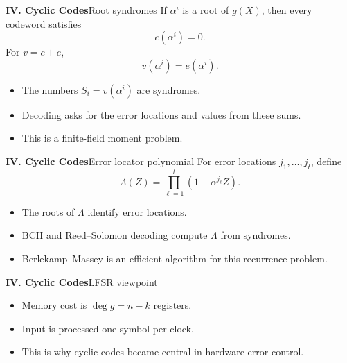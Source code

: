 \begin{frame}{\textbf{IV. Cyclic Codes}}{Root syndromes}
\small
If $\alpha^i$ is a root of $g(X)$, then every codeword satisfies
\[
  c(\alpha^i)=0.
\]
For $v=c+e$,
\[
  v(\alpha^i)=e(\alpha^i).
\]
\begin{itemize}
  \item The numbers $S_i=v(\alpha^i)$ are syndromes.
  \item Decoding asks for the error locations and values from these sums.
  \item This is a finite-field moment problem.
\end{itemize}
\end{frame}

\begin{frame}{\textbf{IV. Cyclic Codes}}{Error locator polynomial}
\small
For error locations $j_1,\ldots,j_t$, define
\[
  \Lambda(Z)=\prod_{\ell=1}^t(1-\alpha^{j_\ell}Z).
\]
\begin{itemize}
  \item The roots of $\Lambda$ identify error locations.
  \item BCH and Reed--Solomon decoding compute $\Lambda$ from syndromes.
  \item Berlekamp--Massey is an efficient algorithm for this recurrence problem.
\end{itemize}
\end{frame}

\begin{frame}{\textbf{IV. Cyclic Codes}}{LFSR viewpoint}
\small
{}
\begin{itemize}
  \item Memory cost is $\deg g=n-k$ registers.
  \item Input is processed one symbol per clock.
  \item This is why cyclic codes became central in hardware error control.
\end{itemize}
\end{frame}

